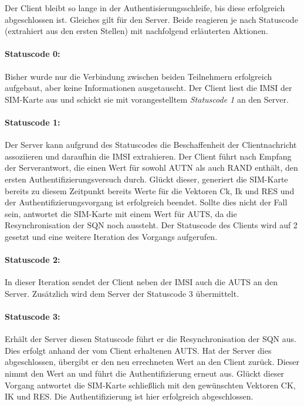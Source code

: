     Der Client bleibt so lange in der Authentisierungsschleife, bis diese erfolgreich abgeschlossen ist.
    Gleiches gilt für den Server. Beide reagieren je nach Statuscode (extrahiert aus den ersten Stellen)
    mit nachfolgend erläuterten Aktionen.

    \paragraph{Statuscode 0:} Bisher wurde nur die Verbindung zwischen beiden Teilnehmern erfolgreich aufgebaut,
    aber keine Informationen ausgetauscht. Der Client liest die IMSI der SIM-Karte aus und schickt sie mit
    vorangestelltem \textit{Statuscode 1} an den Server.

    \paragraph{Statuscode 1:} Der Server kann aufgrund des Statuscodes die Beschaffenheit
    der Clientnachricht assoziieren und daraufhin die IMSI extrahieren. Der Client führt
    nach Empfang der Serverantwort, die einen Wert für sowohl AUTN als auch RAND enthält, den
    ersten Authentifizierungsversuch durch. Glückt dieser, generiert die SIM-Karte bereits zu diesem
    Zeitpunkt bereits Werte für die Vektoren Ck, Ik und RES und der Authentifizierungsvorgang ist
    erfolgreich beendet. Sollte dies nicht der Fall sein, antwortet die SIM-Karte mit einem Wert für
    AUTS, da die Resynchronisation der SQN noch aussteht. Der Statuscode des Clients wird auf 2 gesetzt
    und eine weitere Iteration des Vorgangs aufgerufen.

    \paragraph{Statuscode 2:} In dieser Iteration sendet der Client neben der IMSI auch die AUTS an den
    Server. Zusätzlich wird dem Server der Statuscode 3 übermittelt.

    \paragraph{Statuscode 3:} Erhält der Server diesen Statuscode führt er die Resynchronisation der SQN
    aus. Dies erfolgt anhand der vom Client erhaltenen AUTS. Hat der Server dies abgeschlossen, übergibt er
    den neu errechneten Wert an den Client zurück. Dieser nimmt den Wert an und führt die Authentifizierung
    erneut aus. Glückt dieser Vorgang antwortet die SIM-Karte schließlich mit den gewünschten Vektoren
    CK, IK und RES. Die Authentifizierung ist hier erfolgreich abgeschlossen.

\clearpage
